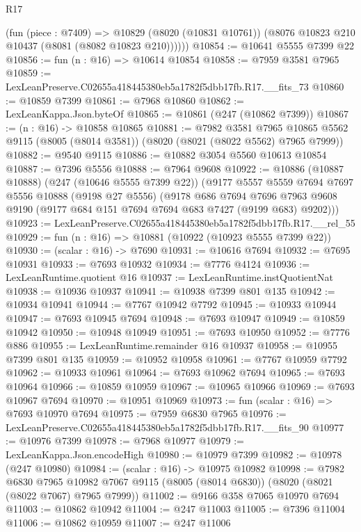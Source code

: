 \begin{lexlean}{R17}
\begin{coremodule}
        (fun (piece : @7409) =>
        @10829 (@8020 (@10831 @10761)) (@8076 @10823 @210 @10437 (@8081 (@8082 @10823 @210))))))
@10854 := @10641 @5555 @7399 @22
@10856 := fun (n : @16) => @10614 @10854
@10858 := @7959 @3581 @7965
@10859 := LexLeanPreserve.C02655a418445380eb5a1782f5dbb17fb.R17.__fits_73
@10860 := @10859 @7399
@10861 := @7968 @10860
@10862 := LexLeanKappa.Json.byteOf
@10865 := @10861 (@247 (@10862 @7399))
@10867 := (n : @16) -> @10858 @10865
@10881 := @7982
    @3581
    @7965
    @10865
    @5562
    @9115
    (@8005 (@8014 @3581))
    (@8020 (@8021 (@8022 @5562) @7965 @7999))
@10882 := @9540 @9115
@10886 := @10882 @3054 @5560 @10613 @10854
@10887 := @7396 @5556
@10888 := @7964 @9608
@10922 := @10886
    (@10887 @10888)
    (@247 (@10646 @5555 @7399 @22))
    (@9177
      @5557
      @5559
      @7694
      @7697
      @5556
      @10888
      (@9198 @27 @5556)
      (@9178
        @686
        @7694
        @7696
        @7963
        @9608
        @9190
        (@9177 @684 @151 @7694 @7694 @683 @7427 (@9199 @683) @9202)))
@10923 := LexLeanPreserve.C02655a418445380eb5a1782f5dbb17fb.R17.__rel_55
@10929 := fun (n : @16) => @10881 (@10922 (@10923 @5555 @7399 @22))
@10930 := (scalar : @16) -> @7690
@10931 := @10616 @7694
@10932 := @7695 @10931
@10933 := @7693 @10932
@10934 := @7776 @4124
@10936 := LexLeanRuntime.quotient @16
@10937 := LexLeanRuntime.instQuotientNat
@10938 := @10936 @10937
@10941 := @10938 @7399 @801 @135
@10942 := @10934 @10941
@10944 := @7767 @10942 @7792
@10945 := @10933 @10944
@10947 := @7693 @10945 @7694
@10948 := @7693 @10947
@10949 := @10859 @10942
@10950 := @10948 @10949
@10951 := @7693 @10950
@10952 := @7776 @886
@10955 := LexLeanRuntime.remainder @16 @10937
@10958 := @10955 @7399 @801 @135
@10959 := @10952 @10958
@10961 := @7767 @10959 @7792
@10962 := @10933 @10961
@10964 := @7693 @10962 @7694
@10965 := @7693 @10964
@10966 := @10859 @10959
@10967 := @10965 @10966
@10969 := @7693 @10967 @7694
@10970 := @10951 @10969
@10973 := fun (scalar : @16) => @7693 @10970 @7694
@10975 := @7959 @6830 @7965
@10976 := LexLeanPreserve.C02655a418445380eb5a1782f5dbb17fb.R17.__fits_90
@10977 := @10976 @7399
@10978 := @7968 @10977
@10979 := LexLeanKappa.Json.encodeHigh
@10980 := @10979 @7399
@10982 := @10978 (@247 @10980)
@10984 := (scalar : @16) -> @10975 @10982
@10998 := @7982
    @6830
    @7965
    @10982
    @7067
    @9115
    (@8005 (@8014 @6830))
    (@8020 (@8021 (@8022 @7067) @7965 @7999))
@11002 := @9166 @358 @7065 @10970 @7694
@11003 := @10862 @10942
@11004 := @247 @11003
@11005 := @7396 @11004
@11006 := @10862 @10959
@11007 := @247 @11006

\end{coremodule}
\end{lexlean}
